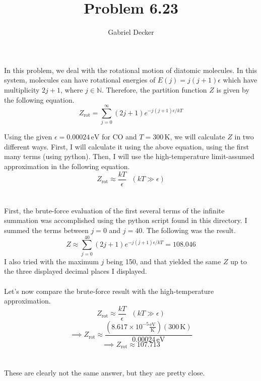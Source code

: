 \documentclass[12pt]{article}
\title{Problem 6.23}
\author{Gabriel Decker}
\newcommand{\N}{\mathbb{N}}
\newcommand{\boltzmannConstInEV}{8.617\times10^{-5}\frac{\text{eV}}{\text{K}}}
\begin{document}
\maketitle
\begin{flushleft}

In this problem, we deal with the rotational motion of diatomic molecules.
In this system, molecules can have rotational energies of $E(j)=j(j+1)\epsilon$ which have multiplicity $2j+1$, where $j\in\N$.
Therefore, the partition function $Z$ is given by the following equation.
\begin{equation}
    Z_\text{rot}=\sum_{j=0}^\infty(2j+1)e^{-j(j+1)\epsilon/kT}
\end{equation}

Using the given $\epsilon=0.00024\,\text{eV}$ for CO and $T=300\,\text{K}$, we will calculate $Z$ in two different ways.
First, I will calculate it using the above equation, using the first many terms (using python).
Then, I will use the high-temperature limit-assumed approximation in the following equation.
\begin{equation}
    Z_\text{rot}\approx\frac{kT}{\epsilon}\ \ \ (kT\gg\epsilon)
\end{equation}\\~\\

First, the brute-force evaluation of the first several terms of the infinite summation was accomplished using the python script found in this directory. I summed the terms between $j=0$ and $j=40$. The following was the result.
$$Z\approx\sum_{j=0}^{40}(2j+1)e^{-j(j+1)\epsilon/kT}=108.046$$
I also tried with the maximum $j$ being 150, and that yielded the same $Z$ up to the three displayed decimal places I displayed.\\~\\

Let's now compare the brute-force result with the high-temperature approximation.
$$Z_\text{rot}\approx\frac{kT}{\epsilon}\ \ \ (kT\gg\epsilon)$$
$$\implies Z_\text{rot}\approx\frac{(\boltzmannConstInEV)(300\,\text{K})}{0.00024\,\text{eV}}$$
$$\implies Z_\text{rot}\approx107.713$$\\~\\

These are clearly not the same answer, but they are pretty close.



\end{flushleft}
\end{document}
